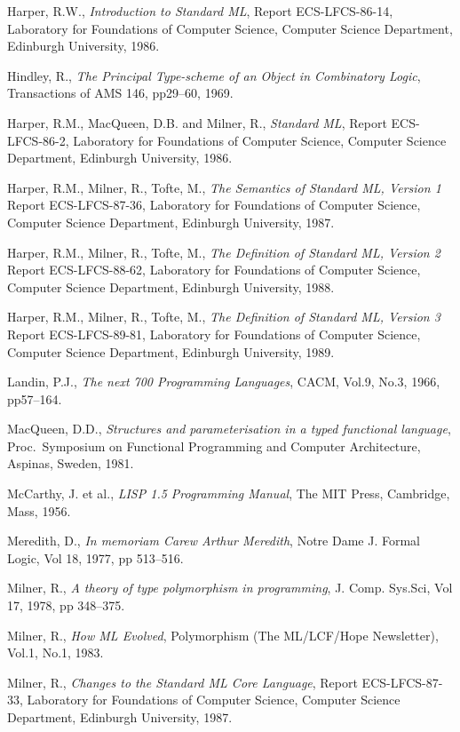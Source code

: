 \begin{thebibliography}{99}
 Harper, R.W., {\em Introduction to Standard ML}, Report
ECS-LFCS-86-14, 
Laboratory for Foundations of Computer Science, 
Computer Science Department, Edinburgh University, 1986.

 Hindley, R., {\em The Principal Type-scheme of an Object in
Combinatory Logic}, Transactions of AMS 146, pp29--60, 1969.

 Harper, R.M., MacQueen, D.B. and Milner, R., 
{\em Standard ML},
Report ECS-LFCS-86-2, 
Laboratory for Foundations of Computer Science, 
Computer Science Department, Edinburgh University, 1986.

 Harper, R.M., Milner, R., Tofte, M., 
{\em The Semantics of Standard ML, Version 1}
Report ECS-LFCS-87-36,
Laboratory for Foundations of Computer Science, 
Computer Science Department, Edinburgh University, 1987.
 
 Harper, R.M., Milner, R., Tofte, M., 
{\em The Definition of Standard ML, Version 2}
Report ECS-LFCS-88-62,
Laboratory for Foundations of Computer Science, 
Computer Science Department, Edinburgh University, 1988.
 
 Harper, R.M., Milner, R., Tofte, M., 
{\em The Definition of Standard ML, Version 3}
Report ECS-LFCS-89-81,
Laboratory for Foundations of Computer Science, 
Computer Science Department, Edinburgh University, 1989.
 
 Landin, P.J., {\em The next 700 Programming Languages}, CACM, Vol.9,
 No.3, 1966, pp57--164.

 MacQueen, D.D., {\em Structures and parameterisation in a typed 
functional language}, Proc.\ Symposium on Functional Programming and Computer
Architecture, Aspinas, Sweden, 1981.

 McCarthy, J. et al., {\em LISP 1.5 Programming Manual}, 
The MIT Press, Cambridge, Mass, 1956.

 Meredith, D., {\em In memoriam Carew Arthur Meredith}, Notre Dame
J. Formal Logic, Vol 18, 1977, pp 513--516.

 Milner, R.,
 {\em A theory of type polymorphism in programming},
J. Comp. Sys.Sci, Vol 17, 1978, pp 348--375.

 Milner, R., {\em How ML Evolved}, 
Polymorphism (The ML/LCF/Hope Newsletter),
Vol.1, No.1, 1983.

 Milner, R., {\em Changes to the Standard ML Core Language},
Report ECS-LFCS-87-33,
Laboratory for Foundations of Computer Science, 
Computer Science Department, Edinburgh University, 1987.


\end{thebibliography}
